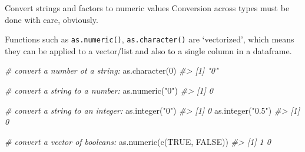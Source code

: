 \documentclass[
  11pt,
  ignorenonframetext,
  svgnames, handout, t]{beamer}
\newenvironment{Shaded}{\begin{snugshade}}{\end{snugshade}}
\newcommand{\CommentTok}[1]{\textcolor[rgb]{0.56,0.35,0.01}{\textit{#1}}}
\newcommand{\ConstantTok}[1]{\textcolor[rgb]{0.00,0.00,0.00}{#1}}
\newcommand{\DecValTok}[1]{\textcolor[rgb]{0.00,0.00,0.81}{#1}}
\newcommand{\FunctionTok}[1]{\textcolor[rgb]{0.00,0.00,0.00}{#1}}
\newcommand{\NormalTok}[1]{#1}
\newcommand{\StringTok}[1]{\textcolor[rgb]{0.31,0.60,0.02}{#1}}
\begin{document}
\begin{frame}[fragile]{Convert strings and factors to numeric values}
\protect\hypertarget{convert-strings-and-factors-to-numeric-values}{}
Conversion across types must be done with care, obviously.

Functions such as \texttt{as.numeric()}, \texttt{as.character()} are
`vectorized', which means they can be applied to a vector/list and also
to a single column in a dataframe.

\footnotesize

\begin{Shaded}
\begin{Highlighting}[]
\CommentTok{\# convert a number ot a string:}
\FunctionTok{as.character}\NormalTok{(}\DecValTok{0}\NormalTok{)}
\CommentTok{\#\textgreater{} [1] "0"}

\CommentTok{\# convert a string to a number:}
\FunctionTok{as.numeric}\NormalTok{(}\StringTok{"0"}\NormalTok{)}
\CommentTok{\#\textgreater{} [1] 0}

\CommentTok{\# convert a string to an integer:}
\FunctionTok{as.integer}\NormalTok{(}\StringTok{"0"}\NormalTok{)}
\CommentTok{\#\textgreater{} [1] 0}
\FunctionTok{as.integer}\NormalTok{(}\StringTok{"0.5"}\NormalTok{)}
\CommentTok{\#\textgreater{} [1] 0}

\CommentTok{\# convert a vector of booleans:}
\FunctionTok{as.numeric}\NormalTok{(}\FunctionTok{c}\NormalTok{(}\ConstantTok{TRUE}\NormalTok{, }\ConstantTok{FALSE}\NormalTok{))}
\CommentTok{\#\textgreater{} [1] 1 0}
\end{Highlighting}
\end{Shaded}

\normalsize
\end{frame}
\end{document}
